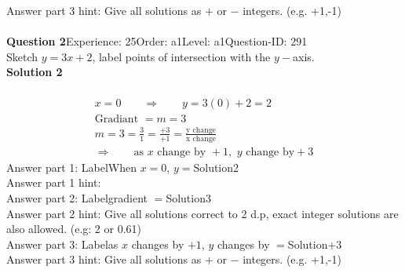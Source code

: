 \documentclass{article}
\begin{document}
Answer part 3 hint: \hspace{15pt}Give all solutions as $+$ or $-$ integers. (e.g. +1,-1)\\
\\[4pt]
\noindent\textbf{Question 2}\hspace{20pt}Experience: 25\hspace{20pt}Order: a1\hspace{20pt}Level: a1\hspace{20pt}Question-ID: 291\\[2pt]
Sketch $y=3x+2$, label points of intersection with the $y-$axis.\\[4pt]
\noindent\textbf{Solution 2}\\[2pt]
\\[-35pt]\begin{align*}
&x=0\qquad\Rightarrow\qquad y=3(0)+2=2&\\[2pt]
&\text{Gradiant}\,\,=m=3&\\[2pt]
&m=3=\displaystyle\frac{3}{1}=\displaystyle\frac{+3}{+1}=\displaystyle\frac{\text{y change}}{\text{x change}}&\\[2pt]
& \Rightarrow\qquad \text{as}\,\, x \,\,\text{change by } +1,\,\, y\,\, \text{change by} +3 &
\end{align*}
Answer part 1: \hspace{10pt}Label\hspace{10pt}When $x=0$, $y=$\hspace{10pt}Solution\hspace{10pt}2\\
Answer part 1 hint: \hspace{15pt}\\
Answer part 2: \hspace{10pt}Label\hspace{10pt}gradient $=$\hspace{10pt}Solution\hspace{10pt}3\\
Answer part 2 hint: \hspace{15pt}Give all solutions correct to 2 d.p, exact integer solutions are also allowed. (e.g: 2 or 0.61)\\
Answer part 3: \hspace{10pt}Label\hspace{10pt}as $x$ changes by $+1$, $y$ changes by $=$\hspace{10pt}Solution\hspace{10pt}+3\\
Answer part 3 hint: \hspace{15pt}Give all solutions as $+$ or $-$ integers. (e.g. +1,-1)\\
\end{document}
